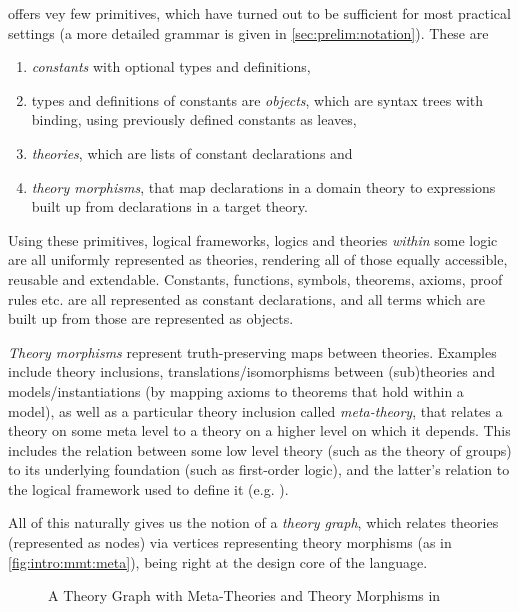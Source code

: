 \ommt offers vey few primitives, which have turned out to be sufficient for most practical settings (a more detailed grammar is given in \autoref{sec:prelim:notation}). These are 
\begin{enumerate}
	\item \emph{constants} with optional types and definitions,
	\item types and definitions of constants are \emph{objects}, which are syntax trees with binding, using 		
		previously defined constants as leaves,
	\item \emph{theories}, which are lists of constant declarations and
	\item \emph{theory morphisms}, that map declarations in a domain theory to expressions
		built up from declarations in a target theory.
\end{enumerate}
Using these primitives, logical frameworks, logics and theories \emph{within} some logic are all uniformly represented as \mmt theories, rendering all of those equally accessible, reusable and extendable. Constants, functions, symbols, theorems, axioms, proof rules etc. are all represented as constant declarations, and all terms which are built up from those are represented as objects.

\emph{Theory morphisms} represent truth-preserving maps between theories. Examples include theory inclusions, translations/isomorphisms between (sub)theories and models/instantiations (by mapping axioms to theorems that hold within a model), as well as a particular theory inclusion called \emph{meta-theory}, that relates a theory on some meta level to a theory on a higher level on which it depends. This includes the relation between some low level theory (such as the theory of groups) to its underlying foundation (such as first-order logic), and the latter's relation to the logical framework used to define it (e.g. \LF). \medskip

All of this naturally gives us the notion of a \emph{theory graph}, which relates theories (represented as nodes) via vertices representing theory morphisms (as in \autoref{fig:intro:mmt:meta}), being right at the design core of the \ommt language.

\begin{figure}
\begin{center}
\caption{A Theory Graph with Meta-Theories and Theory Morphisms in \mmt}\label{fig:intro:mmt:meta}
\end{center}
\end{figure}

